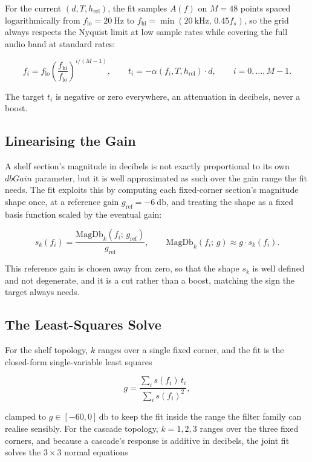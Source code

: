 \documentclass[11pt,a4paper]{article}
\begin{document}
For the current $(d,T,h_\text{rel})$, the fit samples $A(f)$ on $M=48$ points spaced logarithmically from $f_\text{lo}=\SI{20}{\hertz}$ to $f_\text{hi}=\min(\SI{20}{\kilo\hertz},\,0.45 f_s)$, so the grid always respects the Nyquist limit at low sample rates while covering the full audio band at standard rates:

\begin{equation}
f_i = f_\text{lo}\left(\frac{f_\text{hi}}{f_\text{lo}}\right)^{\!i/(M-1)},
\qquad
t_i = -\alpha(f_i,T,h_\text{rel})\cdot d ,
\qquad i = 0,\dots,M-1 .
\end{equation}

The target $t_i$ is negative or zero everywhere, an attenuation in decibels, never a boost.

\subsection{Linearising the Gain}

A shelf section's magnitude in decibels is not exactly proportional to its own $\mathit{dbGain}$ parameter, but it is well approximated as such over the gain range the fit needs.
The fit exploits this by computing each fixed-corner section's magnitude shape once, at a reference gain $g_\text{ref} = \SI{-6}{\decibel}$, and treating the shape as a fixed basis function scaled by the eventual gain:

\begin{equation}
s_k(f_i) = \frac{\text{MagDb}_k(f_i;\,g_\text{ref})}{g_\text{ref}} ,
\qquad
\text{MagDb}_k(f_i;\,g) \approx g \cdot s_k(f_i) .
\end{equation}

This reference gain is chosen away from zero, so that the shape $s_k$ is well defined and not degenerate, and it is a cut rather than a boost, matching the sign the target always needs.

\subsection{The Least-Squares Solve}

For the shelf topology, $k$ ranges over a single fixed corner, and the fit is the closed-form single-variable least squares

\begin{equation}
g = \frac{\sum_i s(f_i)\, t_i}{\sum_i s(f_i)^2} ,
\end{equation}

clamped to $g \in [-60,0]\,\si{\decibel}$ to keep the fit inside the range the filter family can realise sensibly.
For the cascade topology, $k=1,2,3$ ranges over the three fixed corners, and because a cascade's response is additive in decibels, the joint fit solves the $3\times3$ normal equations
\end{document}
